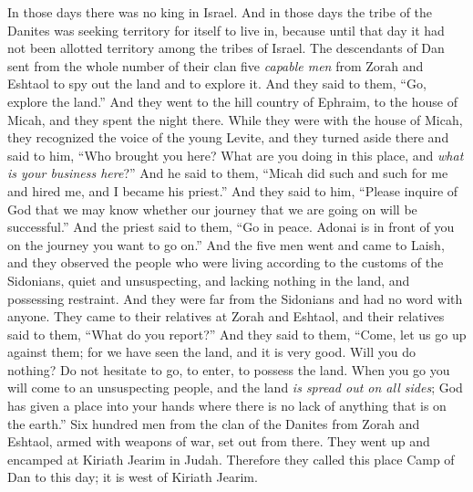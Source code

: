 \begin{biblechapter} %
 In those days there was no king in Israel. And in those days the tribe of the Danites was seeking territory for itself to live in, because until that day it had not been allotted territory among the tribes of Israel.
\verse The descendants of Dan sent from the whole number of their clan five \textit{capable men} from Zorah and Eshtaol to spy out the land and to explore it. And they said to them, “Go, explore the land.” And they went to the hill country of Ephraim, to the house of Micah, and they spent the night there.
\verse While they were with the house of Micah, they recognized the voice of the young Levite, and they turned aside there and said to him, “Who brought you here? What are you doing in this place, and \textit{what is your business here}?”
\verse And he said to them, “Micah did such and such for me and hired me, and I became his priest.”
\verse And they said to him, “Please inquire of God that we may know whether our journey that we are going on will be successful.”
\verse And the priest said to them, “Go in peace. Adonai is in front of you on the journey you want to go on.”
\verse And the five men went and came to Laish, and they observed the people who were living according to the customs of the Sidonians, quiet and unsuspecting, and lacking nothing in the land, and possessing restraint. And they were far from the Sidonians and had no word with anyone.
\verse They came to their relatives at Zorah and Eshtaol, and their relatives said to them, “What do you report?”
\verse And they said to them, “Come, let us go up against them; for we have seen the land, and it is very good. Will you do nothing? Do not hesitate to go, to enter, to possess the land.
\verse When you go you will come to an unsuspecting people, and the land \textit{is spread out on all sides}; God has given a place into your hands where there is no lack of anything that is on the earth.”
\verse Six hundred men from the clan of the Danites from Zorah and Eshtaol, armed with weapons of war, set out from there.
\verse They went up and encamped at Kiriath Jearim in Judah. Therefore they called this place Camp of Dan to this day; it is west of Kiriath Jearim.

\end{biblechapter}
